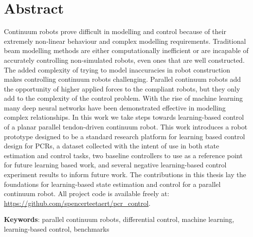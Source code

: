 \section*{Abstract}

Continuum robots prove difficult in modelling and control because of their extremely non-linear behaviour and complex modelling requirements. Traditional beam modelling methods are either computationally inefficient or are incapable of accurately controlling non-simulated robots, even ones that are well constructed. The added complexity of trying to model inaccuracies in robot construction makes controlling continuum robots challenging. Parallel continuum robots add the opportunity of higher applied forces to the compliant robots, but they only add to the complexity of the control problem. With the rise of machine learning many deep neural networks have been demonstrated effective in modelling complex relationships. In this work we take steps towards learning-based control of a planar parallel tendon-driven continuum robot. This work introduces a robot prototype designed to be a standard research platform for learning based control design for PCRs, a dataset collected with the intent of use in both state estimation and control tasks, two baseline controllers to use as a reference point for future learning based work, and several negative learning-based control experiment results to inform future work. The contributions in this thesis lay the foundations for learning-based state estimation and control for a parallel continuum robot. All project code is available freely at: \url{https://github.com/spencerteetaert/pcr_control}.

\textbf{Keywords}: parallel continuum robots, differential control, machine learning, learning-based control, benchmarks